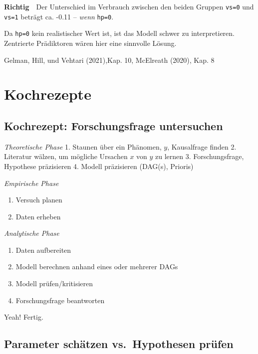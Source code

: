 \documentclass[
  a4paper,
  DIV=11]{scrreprt}
\providecommand{\tightlist}{%
  \setlength{\itemsep}{0pt}\setlength{\parskip}{0pt}}\usepackage{longtable,booktabs,array}
\theoremstyle{definition}
\theoremstyle{remark}
\begin{document}
\textbf{Richtig 👼} Der Unterschied im Verbrauch zwischen den beiden
Gruppen \texttt{vs=0} und \texttt{vs=1} beträgt ca. -0.11 -- \emph{wenn}
\texttt{hp=0}.

Da \texttt{hp=0} kein realistischer Wert ist, ist das Modell schwer zu
interpretieren. Zentrierte Prädiktoren wären hier eine sinnvolle Lösung.

Gelman, Hill, und Vehtari (2021),Kap. 10, McElreath (2020), Kap. 8

\hypertarget{kochrezepte}{%
\section{Kochrezepte 🍲}\label{kochrezepte}}

\hypertarget{kochrezept-forschungsfrage-untersuchen}{%
\subsection{Kochrezept: Forschungsfrage
untersuchen}\label{kochrezept-forschungsfrage-untersuchen}}

\emph{Theoretische Phase} 1. Staunen über ein Phänomen, \(y\),
Kausalfrage finden 2. Literatur wälzen, um mögliche Ursachen \(x\) von
\(y\) zu lernen 3. Forschungsfrage, Hypothese präzisieren 4. Modell
präzisieren (DAG(s), Prioris)

\emph{Empirische Phase}

\begin{enumerate}
\def\labelenumi{\arabic{enumi}.}
\setcounter{enumi}{4}
\tightlist
\item
  Versuch planen
\item
  Daten erheben
\end{enumerate}

\emph{Analytische Phase}

\begin{enumerate}
\def\labelenumi{\arabic{enumi}.}
\setcounter{enumi}{6}
\tightlist
\item
  Daten aufbereiten
\item
  Modell berechnen anhand eines oder mehrerer DAGs
\item
  Modell prüfen/kritisieren
\item
  Forschungsfrage beantworten
\end{enumerate}

Yeah! Fertig.

\hypertarget{parameter-schuxe4tzen-vs.-hypothesen-pruxfcfen}{%
\subsection{Parameter schätzen vs.~Hypothesen
prüfen}\label{parameter-schuxe4tzen-vs.-hypothesen-pruxfcfen}}
\end{document}
